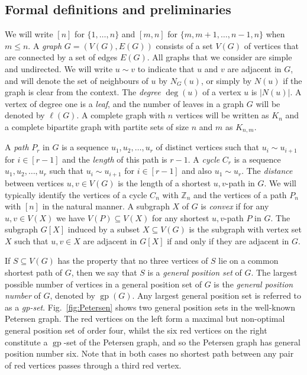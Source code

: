 \documentclass[a4paper,12pt]{article}
\DeclareMathOperator{\gp}{gp}
\theoremstyle{definition}
\begin{document}
	\subsection{Formal definitions and preliminaries} \label{subsec-def}
	
	We will write $[n]$ for $\{ 1,\dots, n\} $ and $[m,n]$ for $\{ m,m+1,\dots ,n-1,n\} $ when $m \leq n$. A \emph{graph} $G = (V(G),E(G))$ consists of a set $V(G)$ of vertices that are connected by a set of edges $E(G)$. All graphs that we consider are simple and undirected. We will write $u \sim v$ to indicate that $u$ and $v$ are adjacent in $G$, and will denote the set of neighbours of $u$ by $N_G(u)$, or simply by $N(u)$ if the graph is clear from the context. The \emph{degree} $\deg (u)$ of a vertex $u$ is $|N(u)|$. A vertex of degree one is a \emph{leaf}, and the number of leaves in a graph $G$ will be denoted by $\ell (G)$. A complete graph with $n$ vertices will be written as $K_n$ and a complete bipartite graph with partite sets of size $n$ and $m$ as $K_{n,m}$. 
	
	A \emph{path} $P_{r}$ in $G$ is a sequence $u_1,u_2,\dots ,u_r$ of distinct vertices such that $u_i \sim u_{i+1}$ for $i\in [r-1]$ and the \emph{length} of this path is $r-1$. A \emph{cycle} $C_r$ is a sequence $u_1,u_2,\dots ,u_r$ such that $u_i \sim u_{i+1}$ for $i \in [r-1]$ and also $u_1 \sim u_r$. The \emph{distance} between vertices $u,v \in V(G)$ is the length of a shortest $u,v$-path in $G$. We will typically identify the vertices of a cycle $C_n$ with $\mathbb{Z}_n$ and the vertices of a path $P_n$ with $[n]$ in the natural manner. A subgraph $X$ of $G$ is \emph{convex} if for any $u,v \in V(X)$ we have $V(P) \subseteq V(X)$ for any shortest $u,v$-path $P$ in $G$. The subgraph $G[X]$ induced by a subset $X \subseteq V(G)$ is the subgraph with vertex set $X$ such that $u,v \in X$ are adjacent in $G[X]$ if and only if they are adjacent in $G$.
	
	If $S \subseteq V(G)$ has the property that no three vertices of $S$ lie on a common shortest path of $G$, then we say that $S$ is a \emph{general position set} of $G$. The largest possible number of vertices in a general position set of $G$ is the \emph{general position number} of $G$, denoted by $\gp (G)$. Any largest general position set is referred to as a \emph{gp-set}. Fig.~\ref{fig:Petersen} shows two general position sets in the well-known Petersen graph. The red vertices on the left form a maximal but non-optimal general position set of order four, whilst the six red vertices on the right constitute a $\gp $-set of the Petersen graph, and so the Petersen graph has general position number six. Note that in both cases no shortest path between any pair of red vertices passes through a third red vertex.
	
\end{document}
